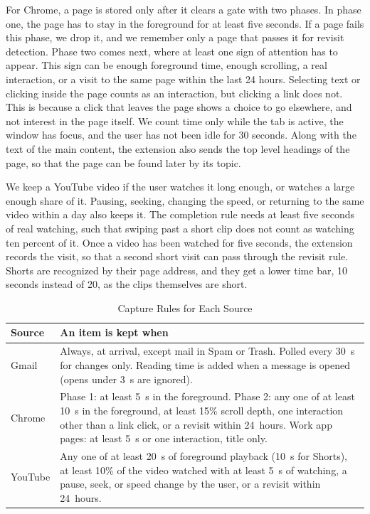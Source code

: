 \documentclass[conference]{IEEEtran}
\begin{document}
For Chrome, a page is stored only after it clears a gate with two phases. In phase one, the page has to stay in the foreground for at least five seconds. If a page fails this phase, we drop it, and we remember only a page that passes it for revisit detection. Phase two comes next, where at least one sign of attention has to appear. This sign can be enough foreground time, enough scrolling, a real interaction, or a visit to the same page within the last 24 hours. Selecting text or clicking inside the page counts as an interaction, but clicking a link does not. This is because a click that leaves the page shows a choice to go elsewhere, and not interest in the page itself. We count time only while the tab is active, the window has focus, and the user has not been idle for 30 seconds. Along with the text of the main content, the extension also sends the top level headings of the page, so that the page can be found later by its topic.

We keep a YouTube video if the user watches it long enough, or watches a large enough share of it. Pausing, seeking, changing the speed, or returning to the same video within a day also keeps it. The completion rule needs at least five seconds of real watching, such that swiping past a short clip does not count as watching ten percent of it. Once a video has been watched for five seconds, the extension records the visit, so that a second short visit can pass through the revisit rule. Shorts are recognized by their page address, and they get a lower time bar, 10 seconds instead of 20, as the clips themselves are short.

\begin{table}[t]
\caption{Capture Rules for Each Source}
\label{tab:gates}
\centering
\renewcommand{\arraystretch}{1.05}
\begin{tabular}{|>{\raggedright\arraybackslash}p{1.35cm}|>{\raggedright\arraybackslash}p{6.2cm}|}
\hline
\textbf{Source} & \textbf{An item is kept when} \\
\hline
Gmail & Always, at arrival, except mail in Spam or Trash. Polled every 30~s for changes only. Reading time is added when a message is opened (opens under 3~s are ignored). \\
\hline
Chrome & Phase 1: at least 5~s in the foreground. Phase 2: any one of at least 10~s in the foreground, at least 15\% scroll depth, one interaction other than a link click, or a revisit within 24~hours. Work app pages: at least 5~s or one interaction, title only. \\
\hline
YouTube & Any one of at least 20~s of foreground playback (10~s for Shorts), at least 10\% of the video watched with at least 5~s of watching, a pause, seek, or speed change by the user, or a revisit within 24~hours. \\
\hline
\end{tabular}
\end{table}
\end{document}
